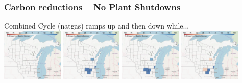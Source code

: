 \documentclass[xcolor=dvipsnames]{beamer}
\begin{document}
\begin{frame}
    \frametitle{Carbon reductions -- No Plant Shutdowns}


  Combined Cycle (natgas) ramps up and then down while... \\
  \includegraphics[width=0.22\textwidth]{includes/no_leakage_no_shutdowns_CC_r0.png}
  \includegraphics[width=0.22\textwidth]{includes/no_leakage_no_shutdowns_CC_r2.png}
  \includegraphics[width=0.22\textwidth]{includes/no_leakage_no_shutdowns_CC_r3.png}
  \includegraphics[width=0.22\textwidth]{includes/no_leakage_no_shutdowns_CC_r4.png}




\end{frame}
\end{document}
